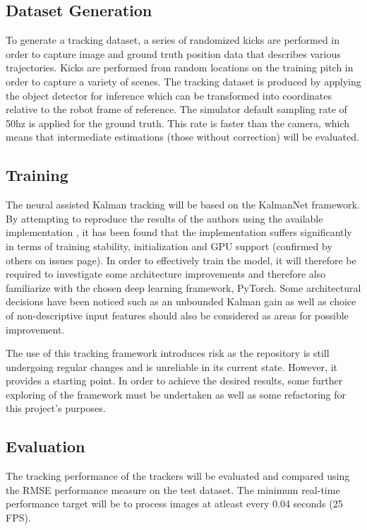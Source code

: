 \documentclass[a4paper,twoside,12pt]{report}
\begin{document}
\subsection{Dataset Generation}

To generate a tracking dataset, a series of randomized kicks are performed in order to capture image and ground truth position data that describes various trajectories. Kicks are performed from random locations on the training pitch in order to capture a variety of scenes. The tracking dataset is produced by applying the object detector for inference which can be transformed into coordinates relative to the robot frame of reference. The simulator default sampling rate of 50hz is applied for the ground truth. This rate is faster than the camera, which means that intermediate estimations (those without correction) will be evaluated.

\subsection{Training}
The neural assisted Kalman tracking will be based on the KalmanNet framework. By attempting to reproduce the results of the authors using the available implementation \cite{kalmangit}, it has been found that the implementation suffers significantly in terms of training stability, initialization and GPU support (confirmed by others on issues page). In order to effectively train the model, it will therefore be required to investigate some architecture improvements and therefore also familiarize with the chosen deep learning framework, PyTorch. Some architectural decisions have been noticed such as an unbounded Kalman gain as well as choice of non-descriptive input features should also be considered as areas for possible improvement.  

The use of this tracking framework introduces risk as the repository is still undergoing regular changes and is unreliable in its current state. However, it provides a starting point. In order to achieve the desired results, some further exploring of the framework must be undertaken as well as some refactoring for this project's purposes.

\subsection{Evaluation}

The tracking performance of the trackers will be evaluated and compared using the RMSE performance measure on the test dataset. The minimum real-time performance target will be to process images at atleast every 0.04 seconds (25 FPS).
\end{document}
